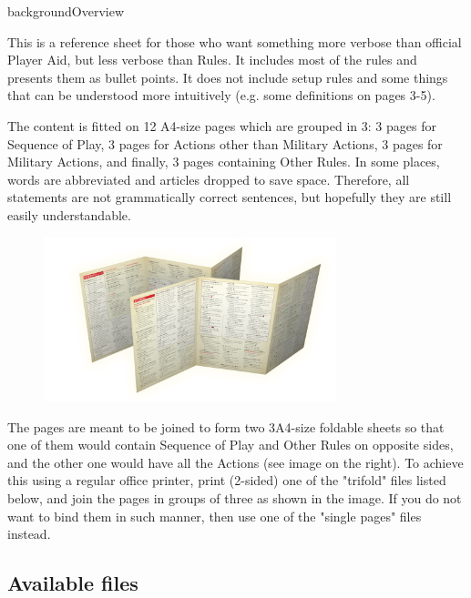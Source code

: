 \documentclass[10pt]{article}
\begin{document}
\thispagestyle{empty}
\ifrenderbw
\else
  \begin{staticcontents*}{backgroundOverview}
  \end{staticcontents*}
\fi


This is a reference sheet for those who want something more verbose than official Player Aid,
but less verbose than Rules.
It includes most of the rules and presents them as bullet points.
It does not include setup rules and some things that can be understood more intuitively (e.g. some definitions on pages 3-5).


The content is fitted on 12 A4-size pages which are grouped in 3:
3 pages for Sequence of Play, 3 pages for Actions other than Military Actions,
3 pages for Military Actions, and finally, 3 pages containing Other Rules.
In some places, words are abbreviated and articles dropped to save space.
Therefore, all statements are not grammatically correct sentences, but hopefully they are still easily understandable.


\begin{figure}
  \centering
  \includegraphics[width=85mm]{trifold.png}
\end{figure}

The pages are meant to be joined to form two 3\texttimes A4-size foldable sheets so that
one of them would contain Sequence of Play and Other Rules on opposite sides,
and the other one would have all the Actions (see image on the right).
To achieve this using a regular office printer, print (2-sided) one of the "trifold" files listed below,
and join the pages in groups of three as shown in the image.
If you do not want to bind them in such manner, then use one of the "single pages" files instead.

\subsection*{Available files}
\end{document}
